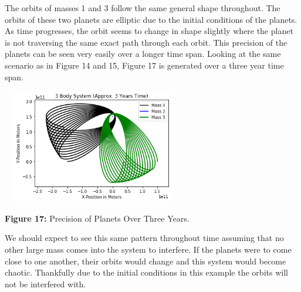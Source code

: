\documentclass[]{article}
\begin{document}
\begin{multicols}{2}
The orbits of masses 1 and 3 follow the same general shape throughout. The orbits of these two planets are elliptic due to the initial conditions of the planets. As time progresses, the orbit seems to change in shape slightly where the planet is not traversing the same exact path through each orbit.  This precision of the planets can be seen very easily over a longer time span. Looking at the same scenario as in Figure 14 and 15, Figure 17 is generated over a three year time span.
\begin{center}
\includegraphics[width=8cm, height=5cm]{PHYS 342 FP 3-Body Dynamics (5).png}
\caption{\small{\textbf{Figure 17:}} \tiny{Precision of Planets Over Three Years.}}
\end{center}
We should expect to see this same pattern throughout time assuming that no other large mass comes into the system to interfere. If the planets were to come close to one another, their orbits would change and this system would become chaotic. Thankfully due to the initial conditions in this example the orbits will not be interfered with.
\par

\end{multicols}
\end{document}

